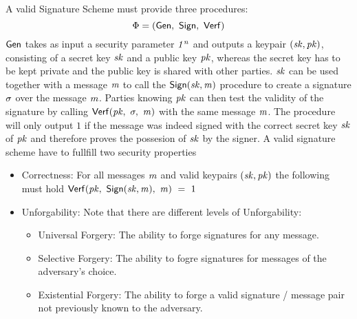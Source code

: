 \begin{definition}\label{def:signatureScheme}
    A valid Signature Scheme must provide three procedures:
    \[ \Phi = (\mathsf{\mathsf{Gen}} ,~ \mathsf{Sign} ,~ \mathsf{Verf}) \]
    $\mathsf{\mathsf{Gen}}$ takes as input a security parameter $\mathit{1^n}$ and outputs a keypair $(\mathit{sk}, \mathit{pk})$, consisting of a secret key $\mathit{sk}$ and a public key $\mathit{pk}$, whereas
    the secret key has to be kept private and the public key is shared with other parties.
    $\mathit{sk}$ can be used together with a message $\mathit{m}$ to call the $\mathsf{Sign}(\mathit{sk}, \mathit{m})$ procedure to create a signature $\sigma$ over the message $\mathit{m}$.
    Parties knowing $\mathit{pk}$ can then test the validity of the signature by calling $\mathsf{Verf}(\mathit{pk} ,~ \sigma ,~ \mathit{m})$ with the same message $\mathit{m}$. The procedure will only output $1$ if the message was
    indeed signed with the correct secret key $\mathit{sk}$ of $\mathit{pk}$ and therefore proves the possesion of $\mathit{sk}$ by the signer.
    A valid signature scheme have to fullfill two security properties
    \begin{itemize}
        \item Correctness: For all messages $\mathit{m}$ and valid keypairs $(\mathit{sk}, \mathit{pk})$ the following must hold $\mathsf{Verf}(\mathit{pk} ,~ \mathsf{Sign}(\mathit{sk}, \mathit{m}) ,~ \mathit{m}) ~=~ 1$
        \item Unforgability: Note that there are different levels of Unforgability:~\cite{goldwasser1988digital}
        \begin{itemize}
            \item Universal Forgery: The ability to forge signatures for any message.
            \item Selective Forgery: The ability to fogre signatures for messages of the adversary's choice.
            \item Existential Forgery: The ability to forge a valid signature / message pair not previously known to the adversary.
        \end{itemize}
    \end{itemize}
\end{definition}

